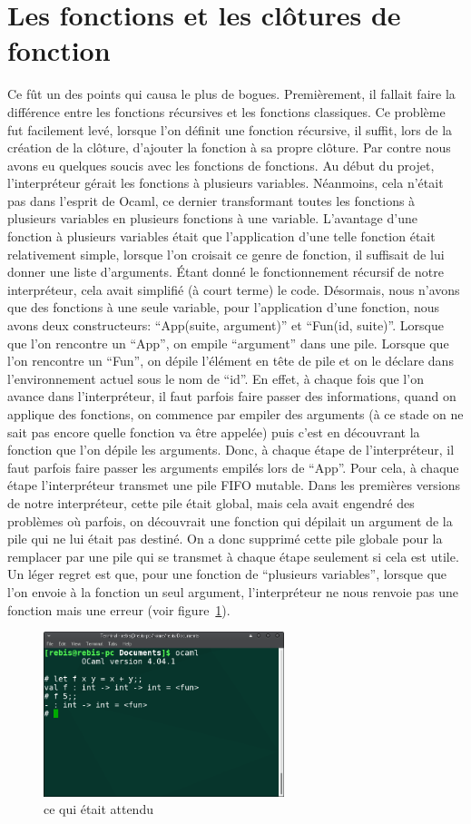 \documentclass[10pt,a4paper]{article}
\begin{document}
\section{Les fonctions et les clôtures de fonction}
Ce fût un des points qui causa le plus de bogues. Premièrement, il fallait faire la différence entre les fonctions récursives et les fonctions classiques. Ce problème fut facilement levé, lorsque l'on définit une fonction récursive, il suffit, lors de la création de la clôture, d'ajouter la fonction à sa propre clôture. Par contre nous avons eu quelques soucis avec les fonctions de fonctions. Au début du projet, l'interpréteur gérait les fonctions à plusieurs variables. Néanmoins, cela n'était pas dans l'esprit de Ocaml, ce dernier transformant toutes les fonctions à plusieurs variables en plusieurs fonctions à une variable. L'avantage d'une fonction à plusieurs variables était que l'application d'une telle fonction était relativement simple, lorsque l'on croisait ce genre de fonction, il suffisait de lui donner une liste d'arguments. Étant donné le fonctionnement récursif de notre interpréteur, cela avait simplifié (à court terme) le code. Désormais, nous n'avons que des fonctions à une seule variable, pour l'application d'une fonction, nous avons deux constructeurs: ``App(suite, argument)'' et ``Fun(id, suite)''. Lorsque que l'on rencontre un ``App'', on empile ``argument'' dans une pile. Lorsque que l'on rencontre un ``Fun'', on dépile l'élément en tête de pile et on le déclare dans l'environnement actuel sous le nom de ``id''. En effet, à chaque fois que l'on avance dans l'interpréteur, il faut parfois faire passer des informations, quand on applique des fonctions, on commence par empiler des arguments (à ce stade on ne sait pas encore quelle fonction va être appelée) puis c'est en découvrant la fonction que l'on dépile les arguments. Donc, à chaque étape de l'interpréteur, il faut parfois faire passer les arguments empilés lors de ``App''. Pour cela, à chaque étape l'interpréteur transmet une pile FIFO mutable. Dans les premières versions de notre interpréteur, cette pile était global, mais cela avait engendré des problèmes où parfois, on découvrait une fonction qui dépilait un argument de la pile qui ne lui était pas destiné. On a donc supprimé cette pile globale pour la remplacer par une pile qui se transmet à chaque étape seulement si cela est utile. Un léger regret est que, pour une fonction de ``plusieurs variables'', lorsque que l'on envoie à la fonction un seul argument, l'interpréteur ne nous renvoie pas une fonction mais une erreur (voir figure~\ref{fig:ex1}).
\begin{figure}
  \center
  \includegraphics[width=7cm]{exemple1.png}
  \caption{ce qui était attendu}
  \label{fig:ex1}
\end{figure}
\end{document}
